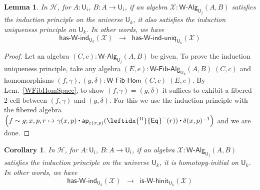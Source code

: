 \documentclass[reqno,10pt,a4paper,oneside]{amsart}
\numberwithin{equation}{section}
\theoremstyle{mythm}
\newtheorem{lemma}[theorem]{Lemma}
\newtheorem{corollary}[theorem]{Corollary}
\theoremstyle{mydef}
\theoremstyle{myrmk}
\newcommand{\Hint}{\mathcal{H}}
\newcommand{\ct}{%
  \mathchoice{\mathbin{\raisebox{0.5ex}{$\displaystyle\centerdot$}}}%
             {\mathbin{\raisebox{0.5ex}{$\centerdot$}}}%
             {\mathbin{\raisebox{0.25ex}{$\scriptstyle\,\centerdot\,$}}}%
             {\mathbin{\raisebox{0.1ex}{$\scriptscriptstyle\,\centerdot\,$}}}}
\newcommand{\funext}{\leftidx{^\Pi}{\mathsf{Eq}}^{=}}
\newcommand{\app}{\mathsf{ap}}
\newcommand{\W}{\mathsf{W}}
\newcommand{\UU}{\mathsf{U}}
\newcommand{\WAlg}{\mathsf{W}\text{-}\mathsf{Alg}}
\newcommand{\WFibAlg}{\mathsf{W}\text{-}\mathsf{Fib}\text{-}\mathsf{Alg}}
\newcommand{\WFibHom}{\mathsf{W}\text{-}\mathsf{Fib}\text{-}\mathsf{Hom}}
\newcommand{\HasWRec}{\mathsf{has}\text{-}\mathsf{W}\text{-}\mathsf{rec}}
\newcommand{\HasWInd}{\mathsf{has}\text{-}\mathsf{W}\text{-}\mathsf{ind}}
\newcommand{\HasWRecUniq}{\mathsf{has}\text{-}\mathsf{W}\text{-}\mathsf{rec}\text{-}\mathsf{uniq}}
\newcommand{\HasWIndUniq}{\mathsf{has}\text{-}\mathsf{W}\text{-}\mathsf{ind}\text{-}\mathsf{uniq}}
\newcommand{\IsWHInit}{\mathsf{is}\text{-}\mathsf{\W}\text{-}\mathsf{hinit}}
\newcommand{\X}{\mathcal{X}}
\begin{document}
\begin{lemma}\label{lem:WIndImpUniqInt}
In $\Hint$, for $A:\UU_i$, $B : A \to \UU_i$, if an algebra $\X : \WAlg_{\UU_j}(A,B)$ satisfies the induction principle on the universe $\UU_k$, it also satisfies the induction uniqueness principle on $\UU_k$. In other words, we have
\[ \HasWInd_{\UU_k}(\X) \;\; \rightarrow \;\; \HasWIndUniq_{\UU_k}(\X) \]
\end{lemma}
\begin{proof}
Let an algebra $(C,c) : \WAlg_{\UU_j}(A,B)$ be given. To prove the induction uniqueness principle, take any algebra $(E,e) : \WFibAlg_{\UU_k}(A,B) \; (C,c)$ and homomorphisms $(f,\gamma), (g,\delta) : \WFibHom \; (C,c) \; (E,e)$. By Lem.~\ref{WFibHomSpace}, to show $(f,\gamma) = (g,\delta)$ it suffices to exhibit a fibered 2-cell between $(f,\gamma)$ and $(g,\delta)$. For this we use the induction principle with the fibered algebra $\Big(f \sim g; x,p,r \mapsto \gamma(x,p) \ct \app_{e(x,p)}(\funext(r)) \ct \delta(x,p)^{-1}\Big)$ and we are done.
\end{proof}


\begin{corollary}\label{lem:WIndImpHInitInt}
In $\Hint$, for $A:\UU_i$, $B : A \to \UU_i$, if an algebra $\X : \WAlg_{\UU_j}(A,B)$ satisfies the induction principle on the universe $\UU_k$, it is homotopy-initial on $\UU_k$. In other words, we have
\[ \HasWInd_{\UU_k}(\X) \;\; \rightarrow \;\; \IsWHInit_{\UU_k}(\X) \]
\end{corollary}
\end{document}
